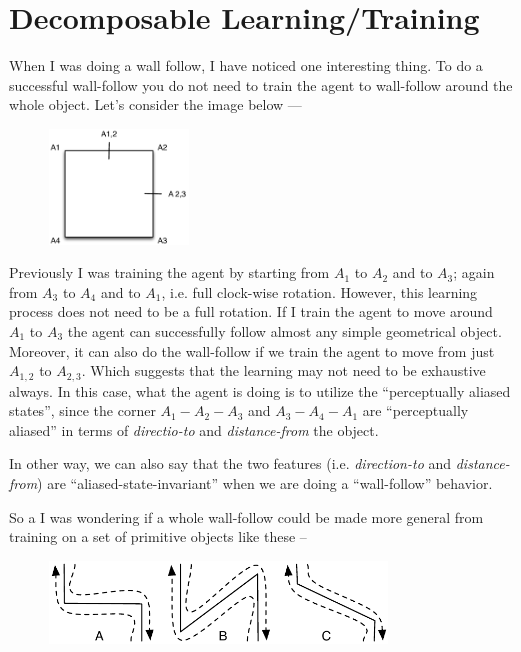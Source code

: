 \documentclass{article}
\begin{document}
\section{Decomposable Learning/Training}

When I was doing a wall follow, I have noticed one interesting thing. To do a successful wall-follow you do not need to train the agent to wall-follow around the whole object. Let's consider the image below --- \\

\begin{figure}[h!]
\centering
	\includegraphics[width=0.33\textwidth]{wall-follow.pdf}
\end{figure}

Previously I was training the agent by starting from \(A_1\) to \(A_2\) and to \(A_3\); again from \(A_3\) to \(A_4\) and to \(A_1\), i.e. full clock-wise rotation. However, this learning process does not need to be a full rotation. If I train the agent to move around \(A_1\) to \(A_3\) the agent can successfully follow almost any simple geometrical object. Moreover, it can also do the wall-follow if we train the agent to move from just \(A_{1,2}\) to \(A_{2,3}\). Which suggests that the learning may not need to be exhaustive always. In this case, what the agent is doing is to utilize the ``perceptually aliased states'', since the corner \(A_1 - A_2 - A_3\) and \(A_3 - A_4 - A_1\) are ``perceptually aliased'' in terms of \emph{directio-to} and \emph{distance-from} the object. 

In other way, we can also say that the two features (i.e. \emph{direction-to} and \emph{distance-from}) are ``aliased-state-invariant'' when we are doing a ``wall-follow'' behavior.

So a I was wondering if a whole wall-follow could be made more general from training on a set of primitive objects like these --

\begin{figure}[h!]
\centering
	\includegraphics[width=0.80\textwidth]{walls.pdf}
\end{figure}
\end{document}
